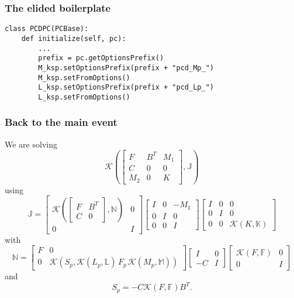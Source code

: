 \documentclass[presentation]{beamer}
\newcommand{\KSP}[2]{\ensuremath{\mathcal{K}\left(#1, \mathbb{#2}\right)}}
\newcommand{\ksp}[1]{\KSP{#1}{#1}}
\begin{document}
\begin{frame}[fragile]
  \frametitle{The elided boilerplate}
\begin{verbatim}
class PCDPC(PCBase):
    def initialize(self, pc):
        ...
        prefix = pc.getOptionsPrefix()
        M_ksp.setOptionsPrefix(prefix + "pcd_Mp_")
        M_ksp.setFromOptions()
        L_ksp.setOptionsPrefix(prefix + "pcd_Lp_")
        L_ksp.setFromOptions()
\end{verbatim}
\end{frame}

\begin{frame}
  \frametitle{Back to the main event}
  We are solving
  \begin{equation*}
    \KSP{\begin{bmatrix}
        F & B^T & M_1\\
        C & 0 & 0 \\
        M_2 & 0 & K
      \end{bmatrix}}{J}
  \end{equation*}
  using
  \begin{equation*}
    \mathbb{J} =
    \begin{bmatrix}
      \KSP{\begin{bmatrix}
          F & B^T\\
          C & 0
        \end{bmatrix}}{N} & 0\\
      0 & I
    \end{bmatrix}
    \begin{bmatrix}
      I & 0 & -M_1\\
      0 & I & 0 \\
      0 & 0 & I
    \end{bmatrix}
    \begin{bmatrix}
      I & 0 & 0\\
      0 & I & 0\\
      0 & 0 &\ksp{K}
    \end{bmatrix}
  \end{equation*}
  with
  \begin{equation*}
    \mathbb{N} = \begin{bmatrix}
      F & 0 \\
      0 & \mathcal{K}(S_p, \KSP{L_p}{L}\,F_p \, \KSP{M_p}{M})
    \end{bmatrix}
    \begin{bmatrix}
      I & 0\\
      -C & I
    \end{bmatrix}
    \begin{bmatrix}
      \ksp{F} & 0 \\
      0 & I
    \end{bmatrix}
  \end{equation*}
  and
  \begin{equation*}
    S_p = -C \ksp{F} B^T.
  \end{equation*}
\end{frame}
\end{document}
